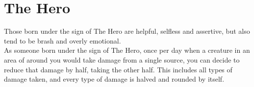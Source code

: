 \section{The Hero}\label{zodiac:hero}

Those born under the sign of The Hero are helpful, selfless and assertive, but also tend to be brash and overly emotional.\\
As someone born under the sign of The Hero, once per day when a creature in an area of  around you would take damage from a single source, you can decide to reduce that damage by half, taking the other half.
This includes all types of damage taken, and every type of damage is halved and rounded by itself.\\
